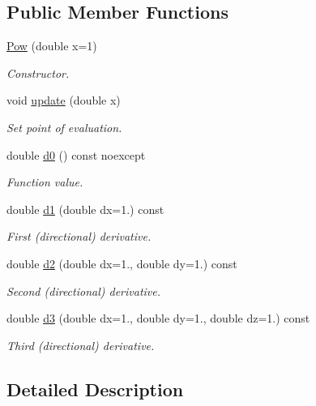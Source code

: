 \subsection*{Public Member Functions}
\begin{DoxyCompactItemize}
\item 
\hyperlink{structfuncy_1_1Pow_a698d5cb72a840c9ab9a1bd7eefe1bd56}{Pow} (double x=1)
\begin{DoxyCompactList}\small\item\em Constructor. \end{DoxyCompactList}\item 
void \hyperlink{structfuncy_1_1Pow_a76e879bfd03f97375bf968f005207005}{update} (double x)
\begin{DoxyCompactList}\small\item\em Set point of evaluation. \end{DoxyCompactList}\item 
double \hyperlink{structfuncy_1_1Pow_a6d30aace3973be93efe9fc2796fd50c5}{d0} () const noexcept
\begin{DoxyCompactList}\small\item\em Function value. \end{DoxyCompactList}\item 
double \hyperlink{structfuncy_1_1Pow_ad101c8bead89df7f815d614818c3c92d}{d1} (double dx=1.) const 
\begin{DoxyCompactList}\small\item\em First (directional) derivative. \end{DoxyCompactList}\item 
double \hyperlink{structfuncy_1_1Pow_a17bb4ab76acaabfb83ea142f955dd146}{d2} (double dx=1., double dy=1.) const 
\begin{DoxyCompactList}\small\item\em Second (directional) derivative. \end{DoxyCompactList}\item 
double \hyperlink{structfuncy_1_1Pow_adf0eebc9e02b4c3769237266778719e1}{d3} (double dx=1., double dy=1., double dz=1.) const 
\begin{DoxyCompactList}\small\item\em Third (directional) derivative. \end{DoxyCompactList}\end{DoxyCompactItemize}


\subsection{Detailed Description}
